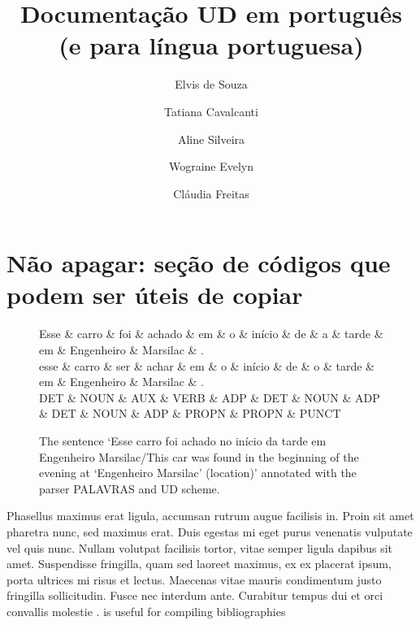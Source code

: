 \documentclass[output=paper,colorlinks,citecolor=brown]{langscibook}
\author{Elvis de Souza\affiliation{PUC-Rio, Brasil}\and Tatiana Cavalcanti\and Aline Silveira\and Wograine Evelyn\and Cláudia Freitas}
\title{Documentação UD em português\\
(e para língua portuguesa)}
\begin{document}
\maketitle

\tableofcontents

\section{Não apagar: seção de códigos que podem ser úteis de copiar} 

\begin{figure}[htbp]
    \centering
    \vspace{.8cm}
    \begin{dependency}
    \begin{deptext}
    Esse \& carro \& foi \& achado \& em \& o \& início \& de \& a \& tarde \& em \& Engenheiro \& Marsilac \& .     \\
    esse \& carro \& ser \& achar  \& em \& o \& início \& de \& o \& tarde \& em \& Engenheiro \& Marsilac \& .     \\
    DET  \& NOUN  \& AUX \& VERB   \& ADP \& DET \& NOUN   \& ADP \& DET \& NOUN  \& ADP \& PROPN      \& PROPN    \& PUNCT \\
    \end{deptext}
    \end{dependency}
    \caption{The sentence `Esse carro foi achado no início da tarde em Engenheiro Marsilac/This car was found in the beginning of the evening at `Engenheiro Marsilac' (location)' annotated with the parser PALAVRAS and UD scheme.}\label{fig:example}
\end{figure}

Phasellus maximus erat ligula, accumsan rutrum augue facilisis in. Proin sit amet pharetra nunc, sed maximus erat. Duis egestas mi eget purus venenatis vulputate vel quis nunc. Nullam volutpat facilisis tortor, vitae semper ligula dapibus sit amet. Suspendisse fringilla, quam sed laoreet maximus, ex ex placerat ipsum, porta ultrices mi risus et lectus. Maecenas vitae mauris condimentum justo fringilla sollicitudin. Fusce nec interdum ante. Curabitur tempus dui et orci convallis molestie \citep{Chomsky1957}. \citet{Nordhoff2018} is useful for compiling bibliographies
\end{document}
